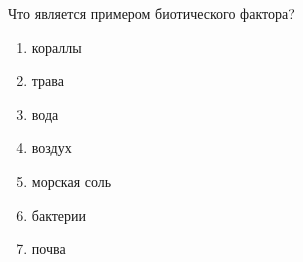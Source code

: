 
Что является примером биотического фактора?

\begin{enumerate}
    \item кораллы
    \item трава
    \item вода
    \item воздух
    \item морская соль
    \item бактерии
    \item почва
\end{enumerate}

